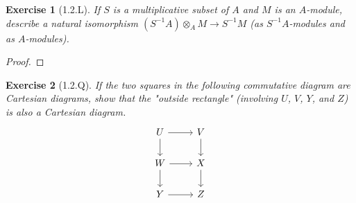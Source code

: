 \documentclass{amsart}
\newtheorem*{exercise*}{Exercise}
\begin{document}
\vspace{0.1in}


\begin{exercise*}[1.2.L]
    If $S$ is a multiplicative subset of $A$ and $M$ is an $A$-module, describe a natural isomorphism $(S^{-1}A)\otimes_A M\rightarrow S^{-1}M$ (as $S^{-1}A$-modules and as $A$-modules).
\end{exercise*}

\vspace{0.1in}

\begin{proof}
	
\end{proof}

\vspace{0.1in}


\begin{exercise*}[1.2.Q]
    If the two squares in the following commutative diagram are Cartesian diagrams, show that the "outside rectangle" (involving $U$, $V$, $Y$, and $Z$) is also a Cartesian diagram. 
    \begin{equation*}
        \begin{tikzcd}
            U \arrow[r] \arrow[d] & V \arrow[d] \\
            W \arrow[r] \arrow[d] & X \arrow[d]\\
            Y \arrow[r] & Z
        \end{tikzcd}
    \end{equation*}
\end{exercise*}

\vspace{0.1in}
\end{document}
